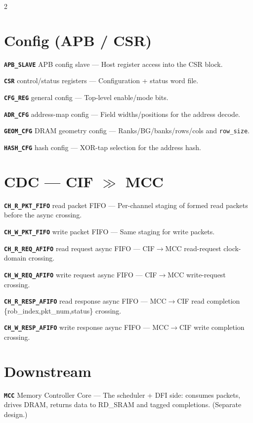 \documentclass[9pt]{extarticle}
\newcommand{\blk}[3]{\noindent\textbf{\texttt{#1}}\; {\footnotesize\color{ff}#2}\; --- #3\par\vspace{1.5pt}}
\begin{document}
\begin{multicols}{2}
\section{Config (APB / CSR)}
\blk{APB\_SLAVE}{APB config slave}{Host register access into the CSR block.}
\blk{CSR}{control/status registers}{Configuration + status word file.}
\blk{CFG\_REG}{general config}{Top-level enable/mode bits.}
\blk{ADR\_CFG}{address-map config}{Field widths/positions for the address decode.}
\blk{GEOM\_CFG}{DRAM geometry config}{Ranks/BG/banks/rows/cols and \texttt{row\_size}.}
\blk{HASH\_CFG}{hash config}{XOR-tap selection for the address hash.}

\section{CDC — CIF $\gg$ MCC}
\blk{CH\_R\_PKT\_FIFO}{read packet FIFO}{Per-channel staging of formed read packets before the async crossing.}
\blk{CH\_W\_PKT\_FIFO}{write packet FIFO}{Same staging for write packets.}
\blk{CH\_R\_REQ\_AFIFO}{read request async FIFO}{CIF$\rightarrow$MCC read-request clock-domain crossing.}
\blk{CH\_W\_REQ\_AFIFO}{write request async FIFO}{CIF$\rightarrow$MCC write-request crossing.}
\blk{CH\_R\_RESP\_AFIFO}{read response async FIFO}{MCC$\rightarrow$CIF read completion \{rob\_index,pkt\_num,status\} crossing.}
\blk{CH\_W\_RESP\_AFIFO}{write response async FIFO}{MCC$\rightarrow$CIF write completion crossing.}

\section{Downstream}
\blk{MCC}{Memory Controller Core}{The scheduler + DFI side: consumes packets, drives DRAM, returns data to RD\_SRAM and tagged completions. (Separate design.)}

\end{multicols}
\end{document}
